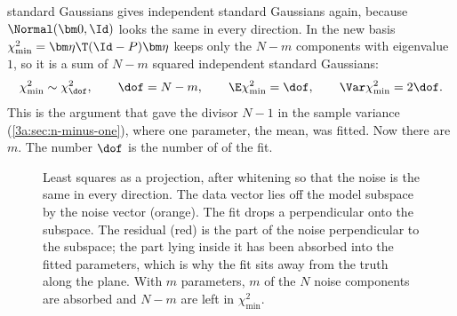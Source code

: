 standard Gaussians gives independent standard Gaussians again, because
$\Normal(\bm0,\Id)$ looks the same in every direction. In the new basis
$\chi^2_{\min}=\bm\eta\T(\Id-P)\bm\eta$ keeps only the $N-m$ components
with eigenvalue $1$, so it is a sum of $N-m$ squared independent standard
Gaussians:
\begin{equation}
  \chi^2_{\min}\sim\chi^2_{\dof},\qquad \dof=N-m,\qquad
  \E\chi^2_{\min}=\dof,\qquad \Var\chi^2_{\min}=2\dof .
  \label{3b:eq:chi2-min-dist}
\end{equation}
This is the argument that gave the divisor $N-1$ in the sample variance
(\cref{3a:sec:n-minus-one}), where one parameter, the mean, was fitted. Now
there are $m$. The number $\dof$ is the number of  of the fit.

\begin{figure}[htbp]
\centering
{}
\caption{Least squares as a projection, after whitening so that the noise is
the same in every direction. The data vector lies off the model subspace by
the noise vector (orange). The fit drops a perpendicular onto the subspace.
The residual (red) is the part of the noise perpendicular to the subspace;
the part lying inside it has been absorbed into the fitted parameters,
which is why the fit sits away from the truth along the plane. With $m$
parameters, $m$ of the $N$ noise components are absorbed and $N-m$ are left
in $\chi^2_{\min}$.}
\label{3b:fig:projection}
\end{figure}

